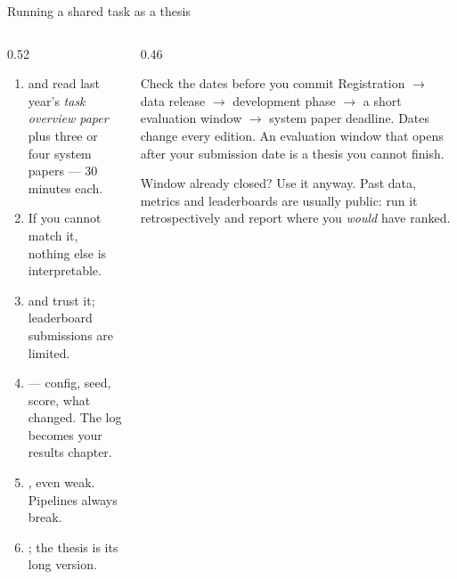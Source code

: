\documentclass[aspectratio=169,11pt]{beamer}
\begin{document}
\begin{frame}{Running a shared task as a thesis}
\begin{columns}[T]
\begin{column}{0.52\textwidth}
\footnotesize
\begin{enumerate}
  \item {} and read last year's \emph{task
        overview paper} plus three or four system papers --- 30 minutes each.
  \item {} If you cannot match it,
        nothing else is interpretable.
  \item {} and trust it; leaderboard
        submissions are limited.
  \item {} --- config, seed, score, what changed. The log
        becomes your results chapter.
  \item {}, even weak. Pipelines always break.
  \item {}; the thesis is its long version.
\end{enumerate}
\end{column}
\begin{column}{0.46\textwidth}
\begin{alertblock}{Check the dates before you commit}
\footnotesize
Registration $\rightarrow$ data release $\rightarrow$ development phase
$\rightarrow$ a short evaluation window $\rightarrow$ system paper deadline.
Dates change every edition. An evaluation window that opens after your
submission date is a thesis you cannot finish.
\end{alertblock}
\begin{block}{Window already closed?}
\footnotesize
Use it anyway. Past data, metrics and leaderboards are usually public: run it
retrospectively and report where you \emph{would} have ranked.
\end{block}
\end{column}
\end{columns}
\end{frame}
\end{document}
